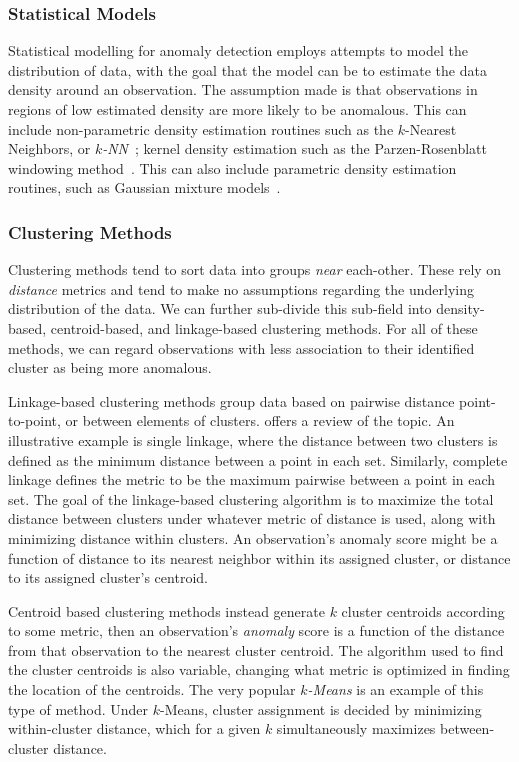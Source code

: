 \subsubsection{Statistical Models}
Statistical modelling for anomaly detection employs attempts to model the distribution of
  data, with the goal that the model can be to estimate the data density around an observation.
  The assumption made is that observations in regions of low estimated density are more likely to be
  anomalous.  This can include non-parametric density estimation routines such as the $k$-Nearest
  Neighbors, or \emph{$k$-NN}~\citep{kramer2013}; kernel density estimation such as the Parzen-Rosenblatt
  windowing method~\citep{parzen1962,rosenblatt1956}.  This can also include parametric density estimation
  routines, such as Gaussian mixture models~\citep{mcnicholas2010}.

\subsubsection{Clustering Methods}
Clustering methods tend to sort data into groups \emph{near} each-other.  These rely on \emph{distance}
  metrics and tend to make no assumptions regarding the underlying distribution of the data.  We can
  further sub-divide this sub-field into density-based, centroid-based, and linkage-based clustering
  methods.  For all of these methods, we can regard observations with less association to their identified
  cluster as being more anomalous.

Linkage-based clustering methods group data based on pairwise distance point-to-point, or between
  elements of clusters.  \cite{ackerman2010} offers a review of the topic.  An illustrative example
  is single linkage, where the distance between two clusters is defined as the minimum distance between
  a point in each set.   Similarly, complete linkage defines the metric to be the maximum pairwise
  between a point in each set.  The goal of the linkage-based clustering algorithm is to maximize the
  total distance between clusters under whatever metric of distance is used, along with minimizing
  distance within clusters.  An observation's anomaly score might be a function of distance to its nearest
  neighbor within its assigned cluster, or distance to its assigned cluster's centroid.

Centroid based clustering methods instead generate $k$ cluster centroids according to some metric,
  then an observation's \emph{anomaly} score is a function of the distance from that
  observation to the nearest cluster centroid.  The algorithm used to find the cluster
  centroids is also variable, changing what metric is optimized in finding the location of the
  centroids.  The very popular \emph{$k$-Means} \citep{hartigan1979} is an example of this type of
  method.  Under $k$-Means, cluster assignment is decided by minimizing within-cluster distance,
  which for a given $k$ simultaneously maximizes between-cluster distance.

